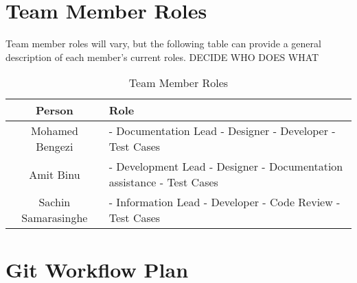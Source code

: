 \documentclass[12pt]{article}
\begin{document}
\section{Team Member Roles}
Team member roles will vary, but the following table can provide a general description of each member's current roles. DECIDE 
WHO DOES WHAT
\begin{table}[h]
\begin{center}
\begin{tabular}{ | c | p{65mm} |  }
\hline
 Person & Role  \\ 
\hline
Mohamed Bengezi & - Documentation Lead \newline - Designer \newline - Developer \newline - Test Cases  \\  
\hline
 Amit Binu & - Development Lead \newline - Designer \newline - Documentation assistance \newline - Test Cases  \\
\hline
 Sachin Samarasinghe & - Information Lead \newline - Developer \newline - Code Review \newline - Test Cases
\\
\hline 
\end{tabular}
\end{center}
\caption{Team Member Roles}
\end{table}

\newpage
\section{Git Workflow Plan}
\end{document}
